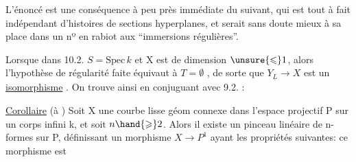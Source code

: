 
L'énoncé  est une conséquence à peu près immédiate du suivant,
qui est tout à fait indépendant d'histoires de sections hyperplanes, et
serait sans doute mieux à sa place dans  un nº en rabiot aux
``immersions régulières''.

















Lorsque dans 10.2.  $S = \mathrm{Spec}\,k$ et X est de dimension $\unsure{\leqslant}1$,
alors l'hypothèse de régularité faite équivaut à $T = \emptyset$ , de sorte
que $Y_{\underline{L}}\to X$ est un \uline{isomorphisme} . On trouve ainsi\unsure{;} en conjuguant
avec 9.2. :

\uline{Corollaire}  (à ) Soit X une courbe lisse géom connexe dans
 l'espace projectif P sur un corps infini k, et soit $n\hand{\geqslant}2$.
Alors il existe un pinceau linéaire de n-formes sur P, définissant un
morphisme $X\to P^1$ ayant les propriétés suivantes: ce morphisme est

